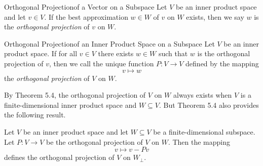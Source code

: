 \documentclass[linearalgebraII]{subfiles}
\begin{document}
    \begin{definition}{Orthogonal Projection}{of a Vector on a Subspace}
        Let $V$ be an inner product space and let $v\in V$. If the best approximation $w\in W$ of $v$ on $W$ exists, then we say $w$ is the \emph{orthogonal projection} of $v$ on $W$.
    \end{definition}

    \begin{definition}{Orthogonal Projection}{of an Inner Product Space on a Subspace}
        Let $V$ be an inner product space. If for all $v\in V$ there exists $w\in W$ such that $w$ is the orthogonal projection of $v$, then we call the unique function $P: V\to V$ defined by the mapping
        \begin{equation*}
            v\mapsto w
        \end{equation*}
        the \emph{orthogonal projection} of $V$ on $W$.
    \end{definition}

    \begin{remark}
        By Theorem 5.4, the orthogonal projection of $V$ on $W$ always exists when $V$ is a finite-dimensional inner product space and $W\subseteq V$. But Theorem 5.4 also provides the following result.
    \end{remark}

    \begin{cor}{}
        Let $V$ be an inner product space and let $W\subseteq V$ be a finite-dimensional subspace. Let $P:V\to V$ be the orthogonal projection of $V$ on $W$. Then the mapping
        \begin{equation*}
            v\mapsto v-Pv
        \end{equation*}
        defines the orthogonal projection of $V$ on $W_\perp$.
    \end{cor}	
\end{document}
